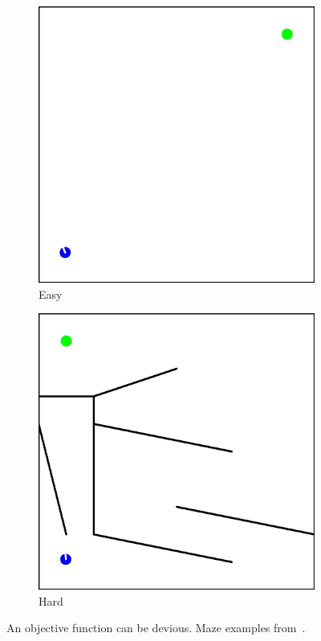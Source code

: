 \begin{figure}[t!]
\centering
\begin{subfigure}[b]{0.3\textwidth}
\includegraphics[width=1.0\textwidth]{../Figures/Misc/MazeEasy.jpg}
\caption{Easy}
\label{fig:mazeEasy}
\end{subfigure}\hspace{2cm} 
\begin{subfigure}[b]{0.3\textwidth} 
\includegraphics[width=1.0\textwidth]{../Figures/Misc/MazeHard.jpg}
\caption{Hard}
\label{fig:mazeHard}
\end{subfigure}
\caption{An objective function can be devious. Maze examples from~\citep{lehman2011abandoning}.}
\label{fig:maze}
\end{figure}


